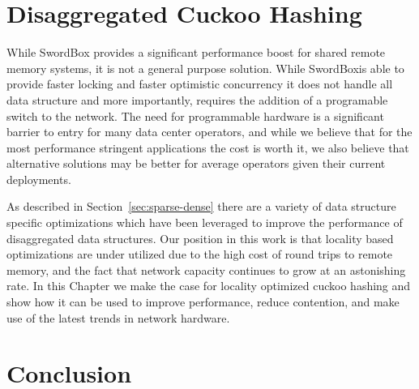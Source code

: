 \documentclass[12pt]{ucsddissertation}
\newcommand{\sword}{SwordBox}
\begin{document}

% 







\chapter{Disaggregated Cuckoo Hashing}
\label{chap:rcuckoo}

While {\sword} provides a significant performance boost for shared remote memory systems, it is not
a general purpose solution. While \sword is able to provide faster locking and faster optimistic
concurrency it does not handle all data structure and more importantly, requires the addition of a
programable switch to the network. The need for programmable hardware is a significant barrier to
entry for many data center operators, and while we believe that for the most performance stringent
applications the cost is worth it, we also believe that alternative solutions may be better for
average operators given their current deployments. 

As described in Section~\ref{sec:sparse-dense} there are a variety of data structure specific
optimizations which have been leveraged to improve the performance of disaggregated data structures.
Our position in this work is that locality based optimizations are under utilized due to the high
cost of round trips to remote memory, and the fact that network capacity continues to grow at an
astonishing rate. In this Chapter we make the case for locality optimized cuckoo hashing and show
how it can be used to improve performance, reduce contention, and make use of the latest trends in
network hardware.



% 

%


%




\chapter{Conclusion}
\end{document}
